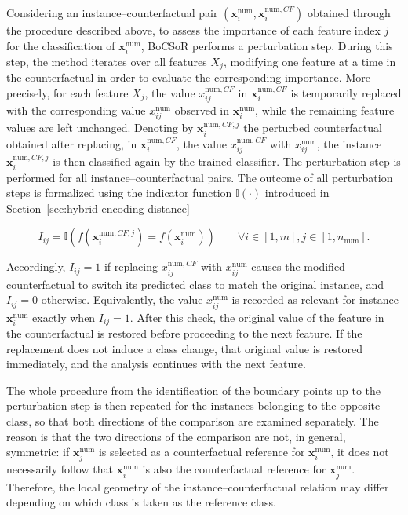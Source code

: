 Considering an instance--counterfactual pair $(\mathbf{x}^{\mathrm{num}}_i, \mathbf{x}_i^{\mathrm{num}, CF})$ obtained through the procedure described above, to assess the importance of each feature index $j$ for the classification of $\mathbf{x}^{\mathrm{num}}_i$, BoCSoR performs a perturbation step. During this step, the method iterates over all features $X_j$, modifying one feature at a time in the counterfactual in order to evaluate the corresponding importance. More precisely, for each feature $X_j$, the value $x_{ij}^{\mathrm{num}, CF}$ in $\mathbf{x}_i^{\mathrm{num}, CF}$ is temporarily replaced with the corresponding value $x_{ij}^{\mathrm{num}}$ observed in $\mathbf{x}^{\mathrm{num}}_i$, while the remaining feature values are left unchanged. Denoting by $\mathbf{x}_{i}^{\mathrm{num}, CF, j}$ the perturbed counterfactual obtained after replacing, in $\mathbf{x}_i^{\mathrm{num}, CF}$, the value $x_{ij}^{\mathrm{num}, CF}$ with $x_{ij}^{\mathrm{num}}$, the instance $\mathbf{x}_{i}^{\mathrm{num}, CF, j}$ is then classified again by the trained classifier. The perturbation step is performed for all instance--counterfactual pairs. The outcome of all perturbation steps is formalized using the indicator function $\mathbb{I}(\cdot)$ introduced in Section~\ref{sec:hybrid-encoding-distance}

\begin{equation}
  I_{ij} = \mathbb{I}\left(f(\mathbf{x}_{i}^{\mathrm{num}, CF, j}) = f(\mathbf{x}^{\mathrm{num}}_i)\right) \qquad \forall i \in [1, m], j \in [1, n_\mathrm{num}].
\end{equation}

Accordingly, $I_{ij}=1$ if replacing $x_{ij}^{\mathrm{num}, CF}$ with $x_{ij}^{\mathrm{num}}$ causes the modified counterfactual to switch its predicted class to match the original instance, and $I_{ij}=0$ otherwise. Equivalently, the value $x_{ij}^{\mathrm{num}}$ is recorded as relevant for instance $\mathbf{x}^{\mathrm{num}}_i$ exactly when $I_{ij}=1$. After this check, the original value of the feature in the counterfactual is restored before proceeding to the next feature. If the replacement does not induce a class change, that original value is restored immediately, and the analysis continues with the next feature.

The whole procedure from the identification of the boundary points up to the perturbation step is then repeated for the instances belonging to the opposite class, so that both directions of the comparison are examined separately. The reason is that the two directions of the comparison are not, in general, symmetric: if $\mathbf{x}^{\mathrm{num}}_j$ is selected as a counterfactual reference for $\mathbf{x}^{\mathrm{num}}_i$, it does not necessarily follow that $\mathbf{x}^{\mathrm{num}}_i$ is also the counterfactual reference for $\mathbf{x}^{\mathrm{num}}_j$. Therefore, the local geometry of the instance--counterfactual relation may differ depending on which class is taken as the reference class. 

